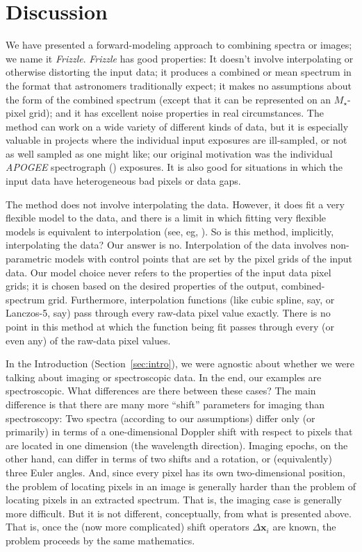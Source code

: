 \documentclass[modern, linenumbers]{aastex631}
\newcommand{\sectionname}{Section}
\newcommand{\secref}[1]{\sectionname~\ref{#1}}
\newcommand{\name}{\textsl{Frizzle}}
\newcommand{\modified}[1]{\textcolor{Emerald}{\textbf{#1}}}
\begin{document}
\section{Discussion}\label{sec:discussion}

We have presented a forward-modeling approach to combining spectra or images;
we name it \name.
\name{} has good properties:
It doesn't involve interpolating or otherwise distorting the input data;
it produces a combined or mean spectrum in the format that astronomers traditionally expect;
it makes no assumptions about the form of the combined spectrum (except that it can be represented on an $M_\star$-pixel grid);
and it has excellent noise properties in real circumstances.
The method can work on a wide variety of different kinds of data, but it is especially valuable in projects where the individual input exposures are ill-sampled, or not as well sampled as one might like; our original motivation was the individual \textsl{APOGEE} spectrograph (\citealt{apogeehardware}) exposures.
It is also good for situations in which the input data have heterogeneous bad pixels or data gaps.

The method does not involve interpolating the data.
However, it does fit a very flexible model to the data, and there is a limit in which fitting very flexible models is equivalent to interpolation (see, eg, \citealt{fittingflexible}).
So is this method, implicitly, interpolating the data?
Our answer is no.
Interpolation of the data involves non-parametric models with control points that are set by the pixel grids of the input data.
Our model choice never refers to the properties of the input data pixel grids; it is chosen based on the desired properties of the output, combined-spectrum grid.
Furthermore, interpolation functions (like cubic spline, say, or Lanczos-5, say) pass through every raw-data pixel value exactly.
There is no point in this method at which the function being fit passes through every (or even any) of the raw-data pixel values.

In the Introduction (\secref{sec:intro}), we were agnostic about whether we were talking about imaging or spectroscopic data.
In the end, our examples are spectroscopic.
What differences are there between these cases?
The main difference is that there are many more ``shift'' parameters for imaging than spectroscopy:
Two spectra (according to our assumptions) differ only (or primarily) in terms of a one-dimensional Doppler shift with respect to pixels that are located in one dimension (the wavelength direction).
Imaging epochs, on the other hand, can differ in terms of two shifts and a rotation, or (equivalently) three Euler angles.
And, since every pixel has its own two-dimensional position, the problem of locating pixels in an image is generally harder than the problem of locating pixels in an extracted spectrum.
That is, the imaging case is generally more difficult.
But it is not different, conceptually, from what is presented above.
That is, once the (now more complicated) shift operators \modified{$\Delta\mathbf{x}_i$} are known, the problem proceeds by the same mathematics.
\end{document}
